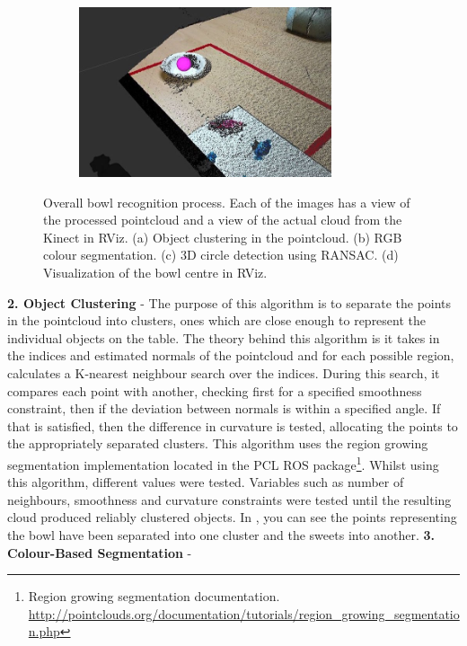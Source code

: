 \begin{figure}[H]
\begin{subfigure}[b]{0.475\textwidth}
        \includegraphics[width=\textwidth, height=5cm]{bowlcentre.jpg}
    \end{subfigure}
    \caption{Overall bowl recognition process. Each of the images has a view of the processed pointcloud and a view of the actual cloud from the Kinect in RViz. (a) Object clustering in the pointcloud. (b) RGB colour segmentation. (c) 3D circle detection using RANSAC. (d) Visualization of the bowl centre in RViz.}
\end{figure}
\textbf{2. Object Clustering} - 
The purpose of this algorithm is to separate the points in the pointcloud into clusters, ones which are close enough to represent the individual objects on the table. The theory behind this algorithm is it takes in the indices and estimated normals of the pointcloud and for each possible region, calculates a K-nearest neighbour search over the indices. During this search, it compares each point with another, checking first for a specified smoothness constraint, then if the deviation between normals is within a specified angle. If that is satisfied, then the difference in curvature is tested, allocating the points to the appropriately separated clusters. This algorithm uses the region growing segmentation implementation located in the PCL ROS package\footnote{Region growing segmentation documentation. \url{http://pointclouds.org/documentation/tutorials/region_growing_segmentation.php}}. Whilst using this algorithm, different values were tested. Variables such as number of neighbours, smoothness and curvature constraints were tested until the resulting cloud produced reliably clustered objects. In \textbf{}, you can see the points representing the bowl have been separated into one cluster and the sweets into another.
\newline\newline
\textbf{3. Colour-Based Segmentation} - 
